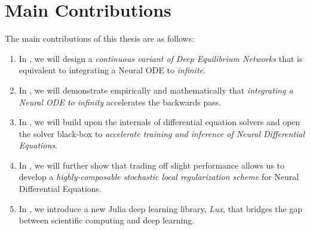 \section{Main Contributions}


The main contributions of this thesis are as follows:
%
\begin{enumerate}
  \item In , we will design a \textit{continuous variant of Deep Equilibrium Networks} that is equivalent to integrating a Neural ODE to \textit{infinite}.
  \item In , we will demonstrate empirically and mathematically that \textit{integrating a Neural ODE to infinity} accelerates the backwards pass.
  \item In , we will build upon the internals of differential equation solvers and open the solver black-box to \textit{accelerate training and inference of Neural Differential Equations}.
  \item In , we will further show that trading off slight performance allows us to develop a \textit{highly-composable stochastic local regularization scheme} for Neural Differential Equations.
  \item In , we introduce a new Julia deep learning library, \textit{Lux}, that bridges the gap between scientific computing and deep learning.
\end{enumerate}

